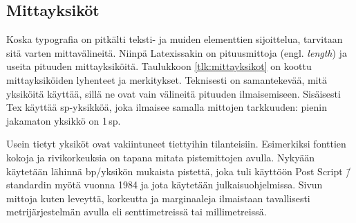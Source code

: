 \subsection{Mittayksiköt}

Koska typografia on pitkälti teksti- ja muiden elementtien sijoittelua,
tarvitaan sitä varten mittavälineitä. Niinpä Latexissakin on
pituusmittoja (engl. \emph{length}) ja useita pituuden mittayksiköitä.
Taulukkoon \ref{tlk:mittayksikot} on koottu mittayksiköiden lyhenteet ja
merkitykset. Teknisesti on samantekevää, mitä yksiköitä käyttää, sillä
ne ovat vain välineitä pituuden ilmaisemiseen. Sisäisesti Tex käyttää
sp-yksikköä, joka ilmaisee samalla mittojen tarkkuuden: pienin jakamaton
yksikkö on 1\,sp.


Usein tietyt yksiköt ovat vakiintuneet tiettyihin tilanteisiin.
Esimerkiksi fonttien kokoja ja rivikorkeuksia on tapana mitata
pistemittojen avulla. Nykyään käytetään lähinnä bp\-/yksikön mukaista
pistettä, joka tuli käyttöön Post Script \=/standardin myötä vuonna 1984
ja jota käytetään jul\-kai\-su\-oh\-jel\-mis\-sa. Sivun mittoja kuten
leveyttä, korkeutta ja marginaaleja ilmaistaan tavallisesti
metrijärjestelmän avulla eli senttimetreissä tai millimetreissä.

